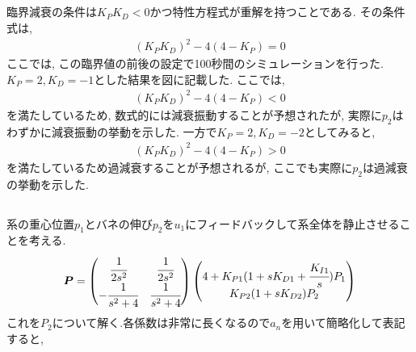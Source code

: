 \documentclass[12pt]{jsarticle}   	%
\begin{document}
\subsection{}
\noindent
臨界減衰の条件は$K_{P} K_{D} < 0$かつ特性方程式が重解を持つことである.
その条件式は, 
\begin{eqnarray}
(K_{P} K_{D})^2 - 4 (4 - K_{P}) = 0
\end{eqnarray}
ここでは, この臨界値の前後の設定で100秒間のシミュレーションを行った. $K_{P} = 2, K_{D} = -1$とした結果を図に記載した. ここでは, 
\begin{eqnarray}
(K_{P} K_{D})^2 - 4 (4 - K_{P}) < 0
\end{eqnarray}
を満たしているため, 数式的には減衰振動することが予想されたが, 実際に$p_2$はわずかに減衰振動の挙動を示した. \newline
一方で$K_{P} = 2, K_{D} = -2$としてみると, 
\begin{eqnarray}
(K_{P} K_{D})^2 - 4 (4 - K_{P}) > 0
\end{eqnarray}
を満たしているため過減衰することが予想されるが, ここでも実際に$p_2$は過減衰の挙動を示した.

\subsection{}
\noindent
系の重心位置$p_1$とバネの伸び$p_2$を$u_1$にフィードバックして系全体を静止させることを考える. 
\begin{eqnarray}
\bm{P} = 
\begin{pmatrix}
\cfrac{1}{2s^2} & \cfrac{1}{2s^2} \\
-\cfrac{1}{s^2 + 4} & \cfrac{1}{s^2 + 4} 
\end{pmatrix}
\begin{pmatrix}
4 + K_{P1} (1 + sK_{D1} + \cfrac{K_{I1}}{s}) P_1 \\
K_{P2} (1 + sK_{D2}) P_2
\end{pmatrix}
\end{eqnarray}
\noindent
これを$P_2$について解く.各係数は非常に長くなるので$a_n$を用いて簡略化して表記すると,
\end{document}
